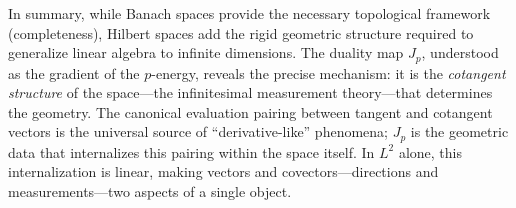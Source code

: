 \documentclass{article}
\begin{document}
In summary, while Banach spaces provide the necessary topological framework (completeness), Hilbert spaces add
the rigid geometric structure required to generalize linear algebra to infinite dimensions. The duality map
$J_p$, understood as the gradient of the $p$-energy, reveals the precise mechanism: it is the \emph{cotangent
structure} of the space---the infinitesimal measurement theory---that determines the geometry. The canonical
evaluation pairing between tangent and cotangent vectors is the universal source of ``derivative-like''
phenomena; $J_p$ is the geometric data that internalizes this pairing within the space itself. In $L^2$ alone,
this internalization is linear, making vectors and covectors---directions and measurements---two aspects of a
single object.

\end{document}
